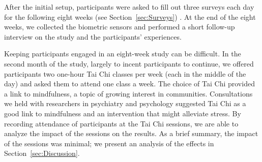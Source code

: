 After the initial setup, participants were asked to fill out three surveys each day for the following eight weeks (see Section~\ref{sec:Surveys}) . At the end of the eight weeks, we collected the biometric sensors and performed a short follow-up interview on the study and the participants' experiences.

Keeping participants engaged in an eight-week study can be
difficult. In the second month of the study, largely to incent participants to
continue, we offered participants two one-hour Tai Chi classes per
week (each in the middle of the day) and asked them to attend one
class a week. The choice of Tai Chi provided a link to mindfulness,
a topic of growing interest in communities. Consultations we held
with researchers in psychiatry and psychology suggested Tai Chi as
a good link to mindfulness and an intervention that might alleviate
stress. By recording attendance of participants at the Tai Chi
sessions, we are able to analyze the impact of the sessions
on the results. As a brief summary, the impact of the
sessions was minimal; we present an analysis
of the effects in Section~\ref{sec:Discussion}.


